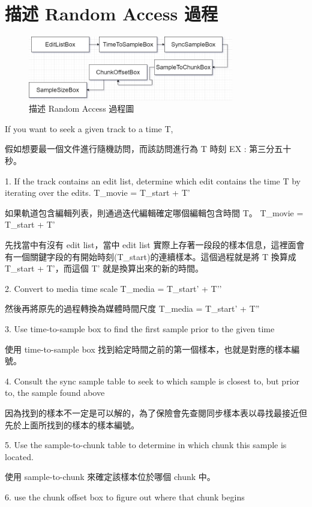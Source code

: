 \documentclass[10pt,UTF8]{ctexart}
\begin{document}
\section{描述 Random Access 過程}


\begin{figure}[H]
\centering 
\includegraphics[width=0.80\textwidth]{g8.png} 
\caption{描述 Random Access 過程圖}
\label{Test}
\end{figure}

If you want to seek a given track to a time T,

假如想要最一個文件進行隨機訪問，而該訪問進行為 T 時刻 EX : 第三分五十秒。

1. If the track contains an edit list, determine which edit contains the time T by iterating over the edits. T\_movie = T\_start + T’

如果軌道包含編輯列表，則通過迭代編輯確定哪個編輯包含時間 T。 T\_movie = T\_start + T'

先找當中有沒有 edit list，當中 edit list 實際上存著一段段的樣本信息，這裡面會有一個關鍵字段的有開始時刻(T\_start)的連續樣本。這個過程就是將 T 換算成 T\_start + T'，而這個 T' 就是換算出來的新的時間。

2. Convert to media time scale T\_media = T\_start’ + T’’

然後再將原先的過程轉換為媒體時間尺度 T\_media = T\_start' + T''


3. Use time-to-sample box to find the first sample prior to the given time

使用 time-to-sample box 找到給定時間之前的第一個樣本，也就是對應的樣本編號。

4. Consult the sync sample table to seek to which sample is closest to, but prior to, the sample found above

因為找到的樣本不一定是可以解的，為了保險會先查閱同步樣本表以尋找最接近但先於上面所找到的樣本的樣本編號。

5. Use the sample-to-chunk table to determine in which chunk this sample is located.

使用 sample-to-chunk 來確定該樣本位於哪個 chunk 中。

6. use the chunk offset box to figure out where that chunk begins
\end{document}
